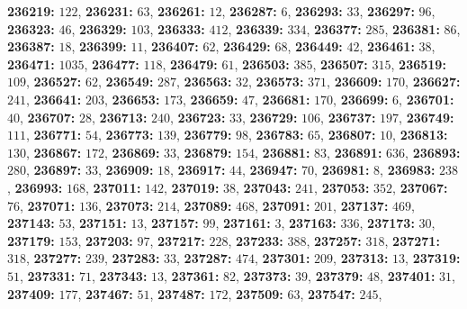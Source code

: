 \textsf{\bfseries 236219:} $122$, \textsf{\bfseries 236231:} $63$, \textsf{\bfseries 236261:} $12$, \textsf{\bfseries 236287:} $6$, \textsf{\bfseries 236293:} $33$, \textsf{\bfseries 236297:} $96$, \textsf{\bfseries 236323:} $46$, \textsf{\bfseries 236329:} $103$, \textsf{\bfseries 236333:} $412$, \textsf{\bfseries 236339:} $334$, \textsf{\bfseries 236377:} $285$, \textsf{\bfseries 236381:} $86$, \textsf{\bfseries 236387:} $18$, \textsf{\bfseries 236399:} $11$, \textsf{\bfseries 236407:} $62$, \textsf{\bfseries 236429:} $68$, \textsf{\bfseries 236449:} $42$, \textsf{\bfseries 236461:} $38$, \textsf{\bfseries 236471:} $1035$, \textsf{\bfseries 236477:} $118$, \textsf{\bfseries 236479:} $61$, \textsf{\bfseries 236503:} $385$, \textsf{\bfseries 236507:} $315$, \textsf{\bfseries 236519:} $109$, \textsf{\bfseries 236527:} $62$, \textsf{\bfseries 236549:} $287$, \textsf{\bfseries 236563:} $32$, \textsf{\bfseries 236573:} $371$, \textsf{\bfseries 236609:} $170$, \textsf{\bfseries 236627:} $241$, \textsf{\bfseries 236641:} $203$, \textsf{\bfseries 236653:} $173$, \textsf{\bfseries 236659:} $47$, \textsf{\bfseries 236681:} $170$, \textsf{\bfseries 236699:} $6$, \textsf{\bfseries 236701:} $40$, \textsf{\bfseries 236707:} $28$, \textsf{\bfseries 236713:} $240$, \textsf{\bfseries 236723:} $33$, \textsf{\bfseries 236729:} $106$, \textsf{\bfseries 236737:} $197$, \textsf{\bfseries 236749:} $111$, \textsf{\bfseries 236771:} $54$, \textsf{\bfseries 236773:} $139$, \textsf{\bfseries 236779:} $98$, \textsf{\bfseries 236783:} $65$, \textsf{\bfseries 236807:} $10$, \textsf{\bfseries 236813:} $130$, \textsf{\bfseries 236867:} $172$, \textsf{\bfseries 236869:} $33$, \textsf{\bfseries 236879:} $154$, \textsf{\bfseries 236881:} $83$, \textsf{\bfseries 236891:} $636$, \textsf{\bfseries 236893:} $280$, \textsf{\bfseries 236897:} $33$, \textsf{\bfseries 236909:} $18$, \textsf{\bfseries 236917:} $44$, \textsf{\bfseries 236947:} $70$, \textsf{\bfseries 236981:} $8$, \textsf{\bfseries 236983:} $238$, \textsf{\bfseries 236993:} $168$, \textsf{\bfseries 237011:} $142$, \textsf{\bfseries 237019:} $38$, \textsf{\bfseries 237043:} $241$, \textsf{\bfseries 237053:} $352$, \textsf{\bfseries 237067:} $76$, \textsf{\bfseries 237071:} $136$, \textsf{\bfseries 237073:} $214$, \textsf{\bfseries 237089:} $468$, \textsf{\bfseries 237091:} $201$, \textsf{\bfseries 237137:} $469$, \textsf{\bfseries 237143:} $53$, \textsf{\bfseries 237151:} $13$, \textsf{\bfseries 237157:} $99$, \textsf{\bfseries 237161:} $3$, \textsf{\bfseries 237163:} $336$, \textsf{\bfseries 237173:} $30$, \textsf{\bfseries 237179:} $153$, \textsf{\bfseries 237203:} $97$, \textsf{\bfseries 237217:} $228$, \textsf{\bfseries 237233:} $388$, \textsf{\bfseries 237257:} $318$, \textsf{\bfseries 237271:} $318$, \textsf{\bfseries 237277:} $239$, \textsf{\bfseries 237283:} $33$, \textsf{\bfseries 237287:} $474$, \textsf{\bfseries 237301:} $209$, \textsf{\bfseries 237313:} $13$, \textsf{\bfseries 237319:} $51$, \textsf{\bfseries 237331:} $71$, \textsf{\bfseries 237343:} $13$, \textsf{\bfseries 237361:} $82$, \textsf{\bfseries 237373:} $39$, \textsf{\bfseries 237379:} $48$, \textsf{\bfseries 237401:} $31$, \textsf{\bfseries 237409:} $177$, \textsf{\bfseries 237467:} $51$, \textsf{\bfseries 237487:} $172$, \textsf{\bfseries 237509:} $63$, \textsf{\bfseries 237547:} $245$, 
